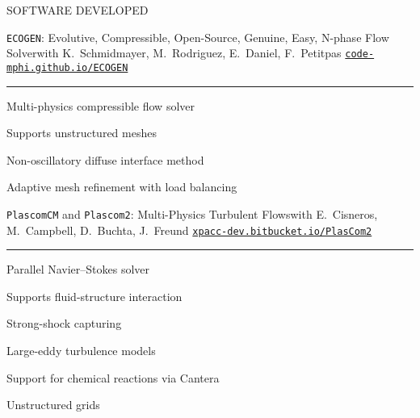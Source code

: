 \documentclass{resume} %
\begin{document}
\begin{rSection}{{\Large S}OFTWARE DEVELOPED}
\begin{rSubsections}{\texttt{ECOGEN}: Evolutive, Compressible, Open-Source, Genuine, Easy, N-phase Flow Solver}{}{with K.\ Schmidmayer, M.\ Rodriguez, E.\ Daniel, F.\ Petitpas}{}
\hfill\href{https://code-mphi.github.io/ECOGEN/}{\texttt{code-mphi.github.io/ECOGEN}}
\vspace{-0.65cm}
\par\noindent\rule{0.97\textwidth}{0.4pt}

    \begin{minipage}{0.45\linewidth}
	\begin{list}{\textbullet}{\leftmargin=2.5em} 
        \item Multi-physics compressible flow solver
        \item Supports unstructured meshes
  	\end{list}
    \end{minipage}
    \hspace{-0.5cm}
    \begin{minipage}{0.65\linewidth}
	\begin{list}{\textbullet}{\leftmargin=2.5em} 
        \item Non-oscillatory diffuse interface method
        \item Adaptive mesh refinement with load balancing
  	\end{list}
    \end{minipage}
\end{rSubsections}
\medskip

\begin{rSubsections}{\texttt{PlascomCM} and \texttt{Plascom2}: Multi-Physics Turbulent Flows}{}{with E.\ Cisneros, M.\ Campbell, D.\ Buchta, J.\ Freund}{}
\hfill\href{https://xpacc-dev.bitbucket.io/PlasCom2/}{\texttt{xpacc-dev.bitbucket.io/PlasCom2}}
\vspace{-0.65cm}
\par\noindent\rule{0.97\textwidth}{0.4pt}

    \begin{minipage}{0.45\linewidth}
	\begin{list}{\textbullet}{\leftmargin=2.5em} 
     	\item Parallel Navier--Stokes solver
        \item Supports fluid-structure interaction
        \item Strong-shock capturing
  	\end{list}
    \end{minipage}
    \hspace{-0.5cm}
    \begin{minipage}{0.65\linewidth}
	\begin{list}{\textbullet}{\leftmargin=2.5em} 
        \item Large-eddy turbulence models 
        \item Support for chemical reactions via Cantera
        \item Unstructured grids
  	\end{list}
    \end{minipage}
\end{rSubsections}
\medskip


\end{rSection}
\end{document}
